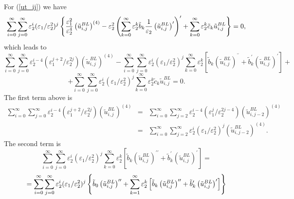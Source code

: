 \documentclass[12pt]{article}
\begin{document}
For (\ref{ut_ij}) we have 
\begin{equation*}
\sum_{i=0}^{\infty }\sum_{j=0}^{\infty }\varepsilon _{2}^{i}(\varepsilon
_{1}/\varepsilon _{2}^{2})^{j}\left\{ \frac{\varepsilon _{1}^{2}}{%
\varepsilon _{2}^{4}}\left(\tilde{u}^{BL}_{i,j}\right)^{(4)}-\varepsilon _{2}^{2}\left(
\sum_{k=0}^{\infty }\varepsilon _{2}^{k}\tilde{b}_{k}\frac{1}{\varepsilon
_{2}}\left(\tilde{u}^{BL}_{i,j}\right)^{\prime }\right) ^{\prime }+\sum_{k=0}^{\infty }\varepsilon _{2}^{k}\tilde{c%
}_{k}\tilde{u}^{BL}_{i,j}\right\} =0,
\end{equation*}
%
which leads to
%
\begin{equation*}
\sum_{i=0}^{\infty }\sum_{j=0}^{\infty }\varepsilon _{2}^{i-4}(\varepsilon
_{1}^{j+2}/\varepsilon _{2}^{2j})\left(\tilde{u}^{BL}_{i,j}\right)^{(4)}-\sum_{i=0}^{\infty
}\sum_{j=0}^{\infty }\varepsilon _{2}^{i}(\varepsilon _{1}/\varepsilon
_{2}^{2})^{j}\sum_{k=0}^{\infty }\varepsilon _{2}^{k}\left[ \tilde{b}_{k}%
\left(\tilde{u}^{BL}_{i,j}\right)^{^{\prime \prime }}+\tilde{b}_{k}^{\prime }\left(\tilde{u}^{BL}%
_{i,j}\right)^{\prime }\right] +
\end{equation*}
%
\begin{equation*}
+\sum_{i=0}^{\infty }\sum_{j=0}^{\infty }\varepsilon _{2}^{i}(\varepsilon
_{1}/\varepsilon _{2}^{2})^{j}\sum_{k=0}^{\infty }\varepsilon
_{2}^{k}\tilde{c}_{k}\tilde{u}^{BL}_{i,j}=0.
\end{equation*}
%
The first term above is
%
\begin{eqnarray*}
\sum_{i=0}^{\infty }\sum_{j=0}^{\infty }\varepsilon _{2}^{i-4}(\varepsilon
_{1}^{j+2}/\varepsilon _{2}^{2j})\left(\tilde{u}^{BL}_{i,j}\right)^{(4)}&=&\sum_{i=0}^{\infty
}\sum_{j=2}^{\infty }\varepsilon _{2}^{i-4}(\varepsilon _{1}^{j}/\varepsilon
_{2}^{2j-4})\left(\tilde{u}^{BL}_{i,j-2}\right)^{(4)} \\
&=&\sum_{i=0}^{\infty }\sum_{j=2}^{\infty
}\varepsilon _{2}^{i}(\varepsilon _{1}/\varepsilon _{2}^{2})^{j}\left(\tilde{u}^{BL}%
_{i,j-2}\right)^{(4)}.
\end{eqnarray*}
%
The second term is
%
\begin{equation*}
\sum_{i=0}^{\infty }\sum_{j=0}^{\infty }\varepsilon _{2}^{i}(\varepsilon
_{1}/\varepsilon _{2}^{2})^{j}\sum_{k=0}^{\infty }\varepsilon _{2}^{k}\left[ 
\tilde{b}_{k}\left(\tilde{u}^{BL}_{i,j}\right)^{{\prime \prime }}+\tilde{b}_{k}^{\prime }%
\left(\tilde{u}^{BL}_{i,j}\right)^{\prime }\right] =
\end{equation*}%
\begin{equation*}
=\sum_{i=0}^{\infty }\sum_{j=0}^{\infty }\varepsilon _{2}^{i}(\varepsilon
_{1}/\varepsilon _{2}^{2})^{j}\left\{ \tilde{b}_{0}\left(\tilde{u}^{BL}_{i,j}\right)^{\prime
\prime }+\sum_{k=1}^{\infty }\varepsilon _{2}^{k}\left[ \tilde{b}_{k}\left(\tilde{%
u}^{BL}_{i,j}\right)^{\prime \prime }+\tilde{b}_{k}^{\prime }\left(\tilde{u}^{BL}_{i,j}\right)^{\prime }%
\right] \right\}
\end{equation*}
\end{document}
